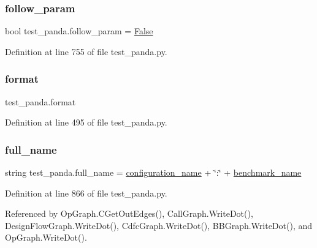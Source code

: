 \subsubsection{\texorpdfstring{follow\+\_\+param}{follow\_param}}
{\footnotesize\ttfamily bool test\+\_\+panda.\+follow\+\_\+param = \hyperlink{namespacetest__panda_af93daddc6b1a54e0ad3c68aa4c89eb92}{False}}



Definition at line 755 of file test\+\_\+panda.\+py.

\mbox{\label{namespacetest__panda_a6f835898965d6dbfb876b0e354269102}} 
\subsubsection{\texorpdfstring{format}{format}}
{\footnotesize\ttfamily test\+\_\+panda.\+format}



Definition at line 495 of file test\+\_\+panda.\+py.

\mbox{\label{namespacetest__panda_a99098d1c922dd11b8a58c871b54d24eb}} 
\subsubsection{\texorpdfstring{full\+\_\+name}{full\_name}}
{\footnotesize\ttfamily string test\+\_\+panda.\+full\+\_\+name = \hyperlink{namespacetest__panda_ab653321a83e07bf3e50afa94f982010a}{configuration\+\_\+name} + \char`\"{}\+:\char`\"{} + \hyperlink{namespacetest__panda_a6adac05e8fa7baf5d3b2f9874ca64d1e}{benchmark\+\_\+name}}



Definition at line 866 of file test\+\_\+panda.\+py.



Referenced by Op\+Graph.\+C\+Get\+Out\+Edges(), Call\+Graph.\+Write\+Dot(), Design\+Flow\+Graph.\+Write\+Dot(), Cdfc\+Graph.\+Write\+Dot(), B\+B\+Graph.\+Write\+Dot(), and Op\+Graph.\+Write\+Dot().

\mbox{\label{namespacetest__panda_a4417256b79fabbb6016d9e1d90f6cebc}} 
